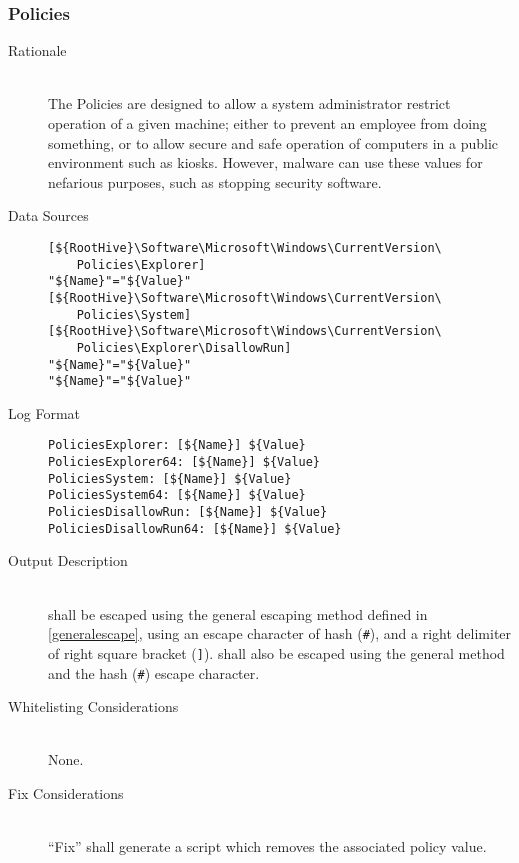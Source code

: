 \subsubsection{Policies}
\begin{description}
\item[Rationale] \hfill \\
The Policies are designed to allow a system administrator restrict operation of
a given machine; either to prevent an employee from doing something, or to allow
secure and safe operation of computers in a public environment such as kiosks.
However, malware can use these values for nefarious purposes, such as stopping
security software.
\item[Data Sources] \hfill
\vspace{-\baselineskip}
\begin{verbatim}
[${RootHive}\Software\Microsoft\Windows\CurrentVersion\
    Policies\Explorer]
"${Name}"="${Value}"
[${RootHive}\Software\Microsoft\Windows\CurrentVersion\
    Policies\System]
[${RootHive}\Software\Microsoft\Windows\CurrentVersion\
    Policies\Explorer\DisallowRun]
"${Name}"="${Value}"
"${Name}"="${Value}"
\end{verbatim}
\item[Log Format] \hfill
\vspace{-\baselineskip}
\begin{verbatim}
PoliciesExplorer: [${Name}] ${Value}
PoliciesExplorer64: [${Name}] ${Value}
PoliciesSystem: [${Name}] ${Value}
PoliciesSystem64: [${Name}] ${Value}
PoliciesDisallowRun: [${Name}] ${Value}
PoliciesDisallowRun64: [${Name}] ${Value}
\end{verbatim}
\item[Output Description] \hfill \\
\var{Name} shall be escaped using the general escaping method defined in
\ref{generalescape}, using an escape character of hash (\verb|#|), and a right
delimiter of right square bracket (\verb|]|).  shall also be escaped
using the general method and the hash (\verb|#|) escape character.
\item[Whitelisting Considerations] \hfill \\
None.
\item[Fix Considerations] \hfill \\
``Fix'' shall generate a script which removes the associated policy value.
\end{description}

